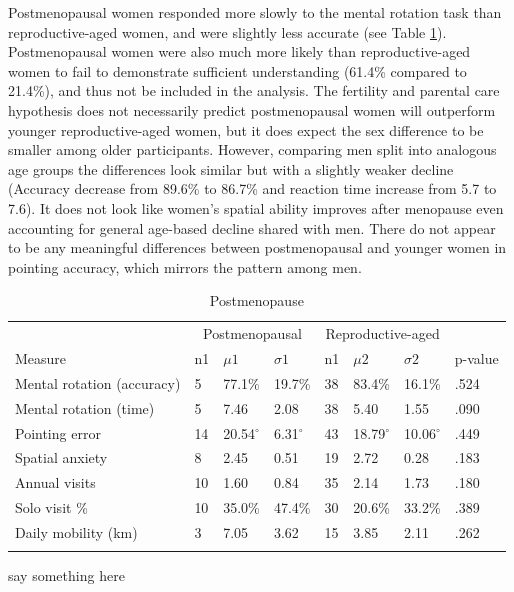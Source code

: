 Postmenopausal women responded more slowly to the mental rotation task than reproductive-aged women, and were slightly less accurate (see Table \ref{tab:meno}).  Postmenopausal women were also much more likely than reproductive-aged women to fail to demonstrate sufficient understanding (61.4\% compared to 21.4\%), and thus not be included in the analysis.  The fertility and parental care hypothesis does not necessarily predict postmenopausal women will outperform younger reproductive-aged women, but it does expect the sex difference to be smaller among older participants.  However, comparing men split into analogous age groups the differences look similar but with a slightly weaker decline (Accuracy decrease from 89.6\% to 86.7\% and reaction time increase from 5.7 to 7.6).  It does not look like women's spatial ability improves after menopause even accounting for general age-based decline shared with men.  There do not appear to be any meaningful differences between postmenopausal and younger women in pointing accuracy, which mirrors the pattern among men.

\begin{table}[h!]
\caption{Postmenopause}
\label{tab:meno}  
\begin{tabular}{llllllll}
\hline\noalign{\smallskip}
& \multicolumn{3}{c}{Postmenopausal} & \multicolumn{3}{c}{Reproductive-aged} & \\
Measure & n1 & $\mu1$ & $\sigma1$ & n1 & $\mu2$ & $\sigma2$ & p-value \\
\noalign{\smallskip}\hline\noalign{\smallskip}
Mental rotation (accuracy) & 5 & 77.1\% & 19.7\% & 38 & 83.4\% & 16.1\% & .524 \\
Mental rotation (time) & 5 & 7.46 & 2.08 & 38 & 5.40 & 1.55 & .090 \\
Pointing error & 14 & 20.54$^{\circ}$ & 6.31$^{\circ}$ & 43 & 18.79$^{\circ}$ & 10.06$^{\circ}$ & .449 \\
Spatial anxiety & 8 & 2.45 & 0.51 & 19 & 2.72 & 0.28 & .183 \\
Annual visits & 10 & 1.60 & 0.84 & 35 & 2.14 & 1.73 & .180 \\
Solo visit \% & 10 & 35.0\% & 47.4\% & 30 & 20.6\% & 33.2\% & .389 \\
Daily mobility (km) & 3 & 7.05 & 3.62 & 15 & 3.85 & 2.11 & .262 \\
\noalign{\smallskip}\hline
\end{tabular}\par
\bigskip
say something here
\end{table}	

